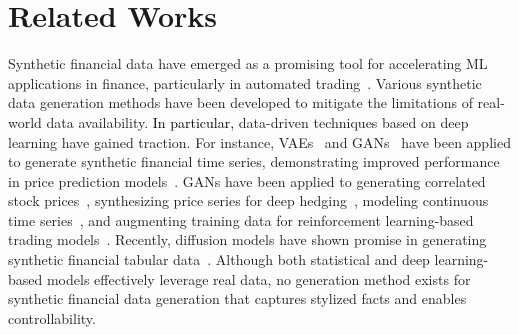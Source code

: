 \documentclass{article}
\newcommand{\hashimoto}[1]{\textcolor{black}{#1}}
\begin{document}



\section{Related Works}

Synthetic financial data have emerged as a promising tool for accelerating ML applications in finance, particularly in automated trading~\cite{synthetic_data_overview}. Various synthetic data generation methods have been developed to mitigate the limitations of real-world data availability.
\hashimoto{In particular,} data-driven techniques based on deep learning have gained traction. For instance, VAEs~\cite{vae} and GANs~\cite{gan} have been applied to generate synthetic financial time series, demonstrating improved performance in price prediction models~\cite{vae_gan}. GANs have been applied to generating correlated stock prices~\cite{gan_multiple}, synthesizing price series for deep hedging~\cite{deephedging_gan}, modeling continuous time series~\cite{gan_time_series}, and augmenting training data for reinforcement learning-based trading models~\cite{gan_to_rl}. Recently, diffusion models have shown promise in generating synthetic financial tabular data~\cite{findiff}. 
Although both statistical and deep learning-based models effectively leverage real data, no generation method exists for synthetic financial data generation that captures stylized facts and enables controllability.%
\end{document}
